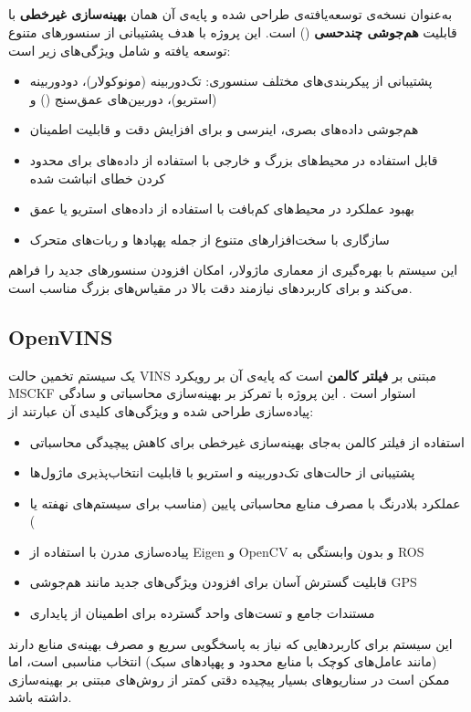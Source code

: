 \documentclass[11pt, a4paper]{article}
\begin{document}
	\subsection{}
	به‌عنوان نسخه‌ی توسعه‌یافته‌ی
	طراحی شده و پایه‌ی آن همان \textbf{بهینه‌سازی غیرخطی} با قابلیت \textbf{هم‌جوشی چندحسی }
	() است. این پروژه با هدف پشتیبانی از سنسورهای متنوع توسعه یافته و شامل ویژگی‌های زیر است:
	\begin{itemize}
		\item 
		پشتیبانی از پیکربندی‌های مختلف سنسوری: تک‌دوربینه
		(مونوکولار)، دودوربینه (استریو)، دوربین‌های عمق‌سنج 
		() و 
		\item هم‌جوشی داده‌های بصری، اینرسی و 
		برای افزایش دقت و قابلیت اطمینان
		\item قابل استفاده در محیط‌های بزرگ و خارجی با استفاده از داده‌های
		برای محدود کردن خطای انباشت شده
		\item بهبود عملکرد در محیط‌های کم‌بافت با استفاده از داده‌های استریو یا عمق
		\item سازگاری با سخت‌افزارهای متنوع از جمله پهپادها و ربات‌های متحرک
	\end{itemize}
	این سیستم با بهره‌گیری از معماری ماژولار، امکان افزودن سنسورهای جدید را فراهم می‌کند و برای کاربردهای نیازمند دقت بالا در مقیاس‌های بزرگ مناسب است.
	
	\subsection{OpenVINS}
	 یک سیستم تخمین حالت 
	\gls{VINS}
	مبتنی بر \textbf{فیلتر کالمن} است که پایه‌ی آن بر رویکرد 
	\gls{MSCKF}
	استوار است
	\cite{geneva2019openvins}.
	این پروژه با تمرکز بر بهینه‌سازی محاسباتی و سادگی پیاده‌سازی طراحی شده و ویژگی‌های کلیدی آن عبارتند از:
	\begin{itemize}
		\item استفاده از فیلتر کالمن به‌جای بهینه‌سازی غیرخطی برای کاهش پیچیدگی محاسباتی
		\item پشتیبانی از حالت‌های تک‌دوربینه و استریو با قابلیت انتخاب‌پذیری ماژول‌ها
		\item عملکرد بلادرنگ با مصرف منابع محاسباتی پایین (مناسب برای سیستم‌های نهفته
		یا )
		\item پیاده‌سازی مدرن با استفاده از Eigen و OpenCV و بدون وابستگی به \gls{ROS}
		\item قابلیت گسترش آسان برای افزودن ویژگی‌های جدید مانند هم‌جوشی
		GPS
		\item مستندات جامع و تست‌های واحد گسترده برای اطمینان از پایداری
	\end{itemize}
	این سیستم برای کاربردهایی که نیاز به پاسخگویی سریع و مصرف بهینه‌ی منابع دارند (مانند عامل‌های کوچک با منابع محدود و پهپادهای سبک) انتخاب مناسبی است، اما ممکن است در سناریوهای بسیار پیچیده دقتی کمتر از روش‌های مبتنی بر بهینه‌سازی داشته باشد.
	
\end{document}
